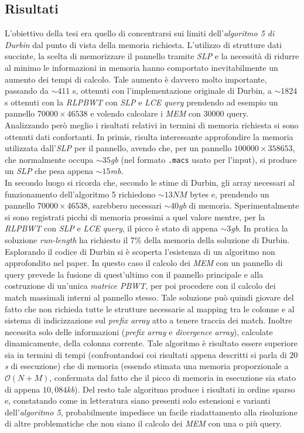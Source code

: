 \documentclass[a4paper,11pt, oneside]{article}
\begin{document}
\subsection*{Risultati}
L'obiettivo della tesi era quello di concentrarsi sui limiti
dell'\textit{algoritmo 5 di Durbin} dal punto di vista della memoria
richiesta. L'utilizzo di strutture dati succinte, la scelta di memorizzare il
pannello tramite \textit{SLP} e la necessità di ridurre al minimo le
informazioni in memoria hanno comportato inevitabilmente un aumento dei tempi di
calcolo. Tale aumento è davvero molto importante, passando
da $\sim 411$ s, ottenuti con l'implementazione originale di Durbin, a $\sim
1824$ s 
ottenuti con la \textit{RLPBWT} con \textit{SLP} e \textit{LCE query} prendendo
ad esempio 
un pannello $70000 \times 46538$ e volendo calcolare i \textit{MEM} con $30000$
query. \\
Analizzando però meglio i risultati relativi in termini di memoria richiesta si
sono ottenuti dati confortanti. In primis, risulta interessante approfondire la
memoria utilizzata dall'\textit{SLP} per il pannello, avendo che, per un
pannello 
$100000\times 358653$, che normalmente occupa $\sim 
35$\textit{gb} (nel formato \texttt{.macs} usato per l'input), si produce un
\textit{SLP} che pesa appena $\sim 15$\textit{mb}.\\
In secondo luogo si ricorda che, secondo le stime di Durbin, gli array necessari
al funzionamento dell'algoritmo 5 richiedono $\sim 13NM$ bytes e,
prendendo un pannello $70000 \times 46538$, sarebbero
necessari $\sim 40$\textit{gb} di memoria. Sperimentalmente si sono registrati
picchi di memoria prossimi a quel valore mentre, per la \textit{RLPBWT} con
\textit{SLP} e \textit{LCE query}, il picco è stato di appena $\sim
3$\textit{gb}. In pratica la soluzione \textit{run-length} ha richiesto il 7\%
della memoria della soluzione di Durbin.\\
Esplorando il codice di Durbin si è scoperta
l'esistenza di un algoritmo non approfondito nel paper. In questo caso il
calcolo dei \textit{MEM} con un pannello di query prevede la fusione di
quest'ultimo 
con il pannello principale e alla costruzione di un'unica \textit{matrice PBWT},
per poi procedere con il calcolo dei match massimali interni 
al pannello stesso. Tale soluzione può quindi giovare del fatto che non richieda
tutte le strutture necessarie al mapping tra le colonne e al sistema di
indicizzazione sul \textit{prefix array} atto a tenere traccia dei
match. Inoltre necessita solo delle informazioni (\textit{prefix array} e
\textit{divergence array}), calcolate dinamicamente, della colonna corrente.
Tale algoritmo è risultato essere superiore sia in termini di tempi
(confrontandosi coi risultati appena descritti si parla di $20$\textit{s} di
esecuzione) che di memoria (essendo stimata una memoria proporzionale a
$\mathcal{O}(N+M)$, confermata dal fatto che il picco di memoria in esecuzione
sia stato di appena $10,084$\textit{kb}). Del resto tale algoritmo produce i
risultati in ordine sparso e, constatando come in letteratura siano presenti
solo estensioni e varianti dell'\textit{algoritmo 5}, probabilmente impedisce un
facile riadattamento alla risoluzione di altre problematiche che non siano il
calcolo dei \textit{MEM} con una o più query.
\end{document}
